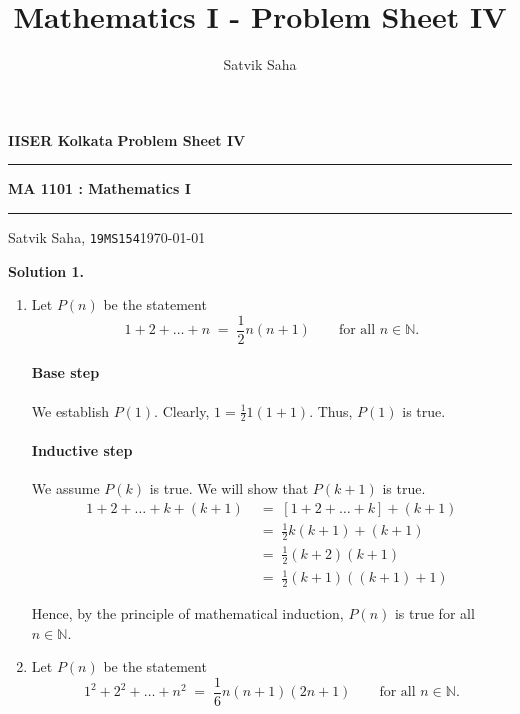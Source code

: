 \documentclass[10pt]{article}
\title{Mathematics I - Problem Sheet IV}
\author{Satvik Saha}
\date{}
\begin{document}
        \par\textbf{IISER Kolkata} \hfill \textbf{Problem Sheet IV}
        \vspace{3pt}
        \hrule
        \vspace{3pt}
        \begin{center}
                \LARGE{\textbf{MA 1101 : Mathematics I}}
        \end{center}
        \vspace{3pt}
        \hrule
        \vspace{3pt}
        Satvik Saha, \texttt{19MS154}\hfill\today
        \vspace{20pt}

        \textbf{Solution 1.}\\
        \begin{enumerate}
                \item Let $P(n)$ be the statement
                \[1 + 2 + \dots + n \;=\; \frac{1}{2}n(n + 1) \quad\quad\text{for all }n \in \mathbb{N}.\]
                \paragraph{Base step}
                We establish $P(1)$. Clearly, $1 = \frac{1}{2}1(1 + 1)$. Thus, $P(1)$ is true.
                \paragraph{Inductive step}
                We assume $P(k)$ is true. We will show that $P(k + 1)$ is true.
                \begin{align*}
                        1 + 2 + \dots + k + (k + 1)
                                \;&=\; [1 + 2 + \dots + k] + (k + 1) \\
                                \;&=\; \frac{1}{2}k(k + 1) + (k + 1) \tag{From $P(k)$}\\
                                \;&=\; \frac{1}{2}(k + 2)(k + 1) \\
                                \;&=\; \frac{1}{2}(k + 1)((k + 1) + 1)
                \end{align*}

                Hence, by the principle of mathematical induction, $P(n)$ is true for all $n \in \mathbb{N}$.
                
                \item Let $P(n)$ be the statement
                \[1^2 + 2^2 + \dots + n^2 \;=\; \frac{1}{6}n(n + 1)(2n + 1) \quad\quad\text{for all }n \in \mathbb{N}.\]

\end{enumerate}
\end{document}
